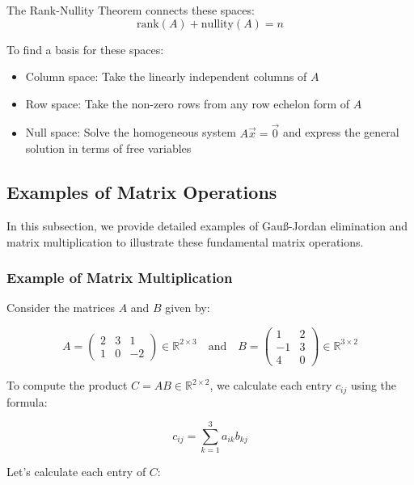 The Rank-Nullity Theorem connects these spaces:
\begin{equation*}
\text{rank}(A) + \text{nullity}(A) = n
\end{equation*}

To find a basis for these spaces:
\begin{itemize}[label=$-$]
    \item Column space: Take the linearly independent columns of $A$
    \item Row space: Take the non-zero rows from any row echelon form of $A$
    \item Null space: Solve the homogeneous system $A\vec{x} = \vec{0}$ and express the general solution in terms of free variables
\end{itemize}
\subsection{Examples of Matrix Operations}

In this subsection, we provide detailed examples of Gauß-Jordan elimination and matrix multiplication to illustrate these fundamental matrix operations.

\subsubsection{Example of Matrix Multiplication}

Consider the matrices $A$ and $B$ given by:

\begin{equation*}
A = 
\begin{pmatrix}
2 & 3 & 1 \\
1 & 0 & -2
\end{pmatrix} \in \mathbb{R}^{2 \times 3}
\quad \text{and} \quad
B = 
\begin{pmatrix}
1 & 2 \\
-1 & 3 \\
4 & 0
\end{pmatrix} \in \mathbb{R}^{3 \times 2}
\end{equation*}

To compute the product $C = AB \in \mathbb{R}^{2 \times 2}$, we calculate each entry $c_{ij}$ using the formula:

\begin{equation*}
c_{ij} = \sum_{k=1}^{3} a_{ik} b_{kj}
\end{equation*}

Let's calculate each entry of $C$:

